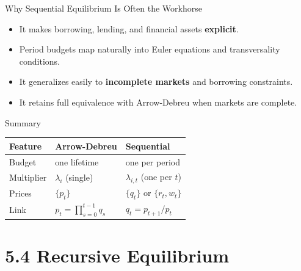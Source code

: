 \documentclass[aspectratio=169,10pt]{beamer}
\begin{document}
\begin{frame}{Why Sequential Equilibrium Is Often the Workhorse}
\begin{itemize}
  \item It makes borrowing, lending, and financial assets \textbf{explicit}.
  \item Period budgets map naturally into Euler equations and transversality conditions.
  \item It generalizes easily to \textbf{incomplete markets} and borrowing constraints.
  \item It retains full equivalence with Arrow-Debreu when markets are complete.
\end{itemize}

\begin{block}{Summary}
\begin{center}
\begin{tabular}{lll}
\toprule
\textbf{Feature} & \textbf{Arrow-Debreu} & \textbf{Sequential} \\
\midrule
Budget & one lifetime & one per period \\
Multiplier & $\lambda_i$ (single) & $\lambda_{i,t}$ (one per $t$) \\
Prices & $\{p_t\}$ & $\{q_t\}$ or $\{r_t,w_t\}$ \\
Link & $p_t=\prod_{s=0}^{t-1}q_s$ & $q_t=p_{t+1}/p_t$ \\
\bottomrule
\end{tabular}
\end{center}
\end{block}
\end{frame}

\section{5.4 Recursive Equilibrium}
\end{document}
